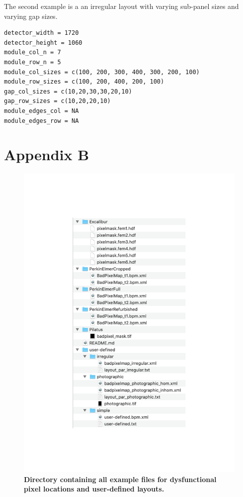 \documentclass[11pt,a4paper]{article}
\begin{document}
The second example is a an irregular layout with varying sub-panel sizes and varying gap sizes.

\begin{verbatim}
detector_width = 1720
detector_height = 1060
module_col_n = 7
module_row_n = 5
module_col_sizes = c(100, 200, 300, 400, 300, 200, 100)
module_row_sizes = c(100, 200, 400, 200, 100)
gap_col_sizes = c(10,20,30,30,20,10)
gap_row_sizes = c(10,20,20,10)
module_edges_col = NA
module_edges_row = NA
\end{verbatim}

\newpage

\section*{Appendix B}
\begin{figure}[htbp]
\vspace{-3cm}
\begin{center}
\includegraphics[width=15cm]{examplesDirectory.pdf}
\vspace{-3cm}
\caption
{
{\bfseries Directory 
containing all example files for dysfunctional pixel locations and user-defined layouts.}
}
\label{fig_examplesDirectory}
\end{center}
\end{figure}
\end{document}
